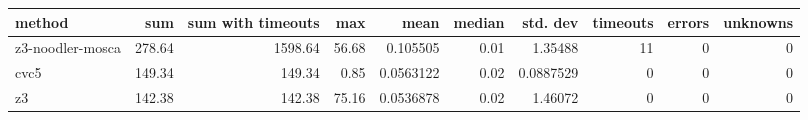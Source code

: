 \begin{tabular}{lrrrrrrrrr}
\hline
 method           &    sum &   sum with timeouts &   max &      mean &   median &   std. dev &   timeouts &   errors &   unknowns \\
\hline
 z3-noodler-mosca & 278.64 &             1598.64 & 56.68 & 0.105505  &     0.01 &  1.35488   &         11 &        0 &          0 \\
 cvc5             & 149.34 &              149.34 &  0.85 & 0.0563122 &     0.02 &  0.0887529 &          0 &        0 &          0 \\
 z3               & 142.38 &              142.38 & 75.16 & 0.0536878 &     0.02 &  1.46072   &          0 &        0 &          0 \\
\hline
\end{tabular}
